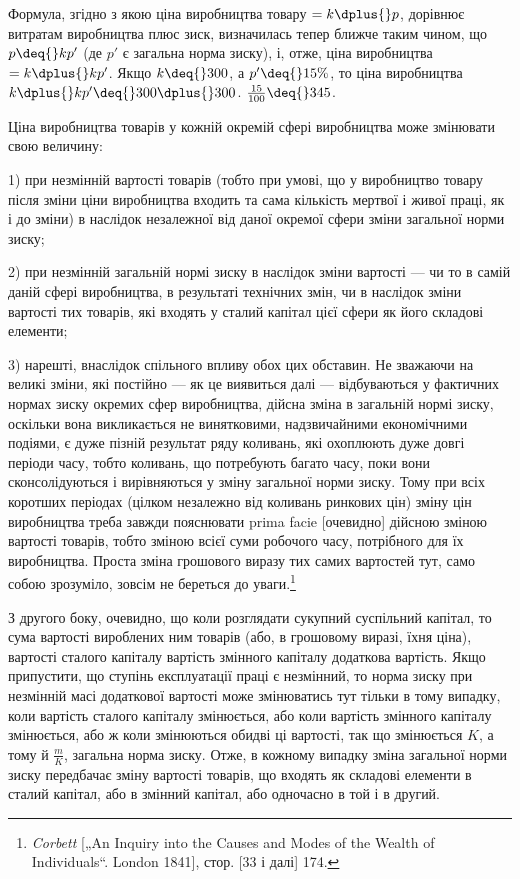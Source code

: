 
Формула, згідно з якою ціна виробництва товару $= k \dplus{} p$,
дорівнює витратам виробництва плюс зиск, визначилась тепер
ближче таким чином, що $p \deq{} kp'$ (де $p'$ є загальна норма зиску),
і, отже, ціна виробництва $= k \dplus{} kp'$. Якщо $k \deq{} 300$, а $p' \deq{} 15\%$,
то ціна виробництва $k \dplus{} kp' \deq{} 300 \dplus{} 300$. $\frac{15}{100} \deq{} 345$.

Ціна виробництва товарів у кожній окремій сфері виробництва може змінювати свою величину:

1) при незмінній вартості товарів (тобто при умові, що у виробництво товару після зміни ціни
виробництва входить та сама
кількість мертвої і живої праці, як і до зміни) в наслідок незалежної від даної окремої сфери зміни
загальної норми зиску;

2) при незмінній загальній нормі зиску в наслідок зміни вартості — чи то в самій даній сфері
виробництва, в результаті
технічних змін, чи в наслідок зміни вартості тих товарів, які
входять у сталий капітал цієї сфери як його складові елементи;

3) нарешті, внаслідок спільного впливу обох цих обставин.
Не зважаючи на великі зміни, які постійно — як це виявиться
далі — відбуваються у фактичних нормах зиску окремих сфер
виробництва, дійсна зміна в загальній нормі зиску, оскільки
вона викликається не винятковими, надзвичайними економічними
подіями, є дуже пізній результат ряду коливань, які охоплюють
дуже довгі періоди часу, тобто коливань, що потребують багато часу, поки вони сконсолідуються і
вирівняються у зміну
загальної норми зиску. Тому при всіх коротших періодах (цілком незалежно від коливань ринкових цін)
зміну цін виробництва
треба завжди пояснювати prima facie [очевидно] дійсною зміною
вартості товарів, тобто зміною всієї суми робочого часу, потрібного для їх виробництва. Проста зміна
грошового виразу тих самих вартостей тут, само собою зрозуміло, зовсім не береться до уваги.\footnote{
\emph{Corbett} [„An Inquiry into the Causes and Modes of the Wealth of Individuals“.
London 1841], стор. [33 і далі] 174.
}

З другого боку, очевидно, що коли розглядати сукупний
суспільний капітал, то сума вартості вироблених ним товарів
(або, в грошовому виразі, їхня ціна), \deq{} вартості сталого капіталу \dplus{} вартість змінного капіталу \dplus{}
додаткова вартість. Якщо припустити, що ступінь експлуатації праці є незмінний, то норма зиску
при незмінній масі додаткової вартості може змінюватись тут
тільки в тому випадку, коли вартість сталого капіталу змінюється,
або коли вартість змінного капіталу змінюється, або ж коли змінюються обидві ці вартості, так що
змінюється $K$, а тому й $\frac{m}{K}$, загальна норма зиску. Отже, в кожному випадку зміна загальної
норми зиску передбачає зміну вартості товарів, що входять як
складові елементи в сталий капітал, або в змінний капітал, або
одночасно в той і в другий.
